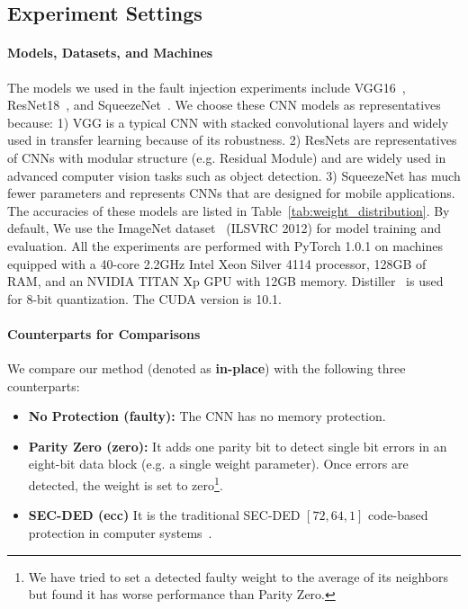 \documentclass{article}
\begin{document}
\subsection{Experiment Settings}
\label{sec:settings}
\paragraph{Models, Datasets, and Machines}

The models we used in the fault injection experiments include VGG16~\cite{simonyan2014very}, ResNet18~\cite{he2016deep}, and SqueezeNet~\cite{iandola2016squeezenet}. 
We choose these CNN models as representatives because: 1) VGG is a typical CNN with stacked convolutional layers and widely used in transfer learning because of its robustness. 2) ResNets are representatives of CNNs with modular structure (e.g. Residual Module) and are widely used in advanced computer vision tasks such as object detection. 3) SqueezeNet has much fewer parameters and represents CNNs that are designed for mobile applications. 
The accuracies of these models are listed in Table~\ref{tab:weight_distribution}. By default, We use the ImageNet dataset~\cite{deng2009imagenet} (ILSVRC 2012) for model training and evaluation.
All the experiments are performed with PyTorch 1.0.1  on machines equipped with a 40-core 2.2GHz Intel Xeon Silver 4114 processor, 128GB of RAM, and an NVIDIA TITAN Xp GPU with 12GB memory. Distiller~\cite{neta_zmora_2018_1297430} is used for 8-bit quantization. The CUDA version is 10.1. 

\paragraph{Counterparts for Comparisons}

We compare our method (denoted as \textbf{in-place}) with the following three counterparts:
\begin{itemize}  \setlength\itemsep{0.01em}
    \item \textbf{No Protection (faulty):} The CNN has no memory protection.
    \item \textbf{Parity Zero (zero):} It adds one parity bit to detect single bit errors in an eight-bit data block (e.g. a single weight parameter). Once errors are detected, the weight is set to zero\footnote{We have tried to set a detected faulty weight to the average of its neighbors but found it has worse performance than Parity Zero.}.    
    \item \textbf{SEC-DED (ecc)} It is the traditional SEC-DED $[72, 64, 1]$ code-based protection in computer systems~\cite{sridharan2015memory}.  
\end{itemize}
\end{document}
